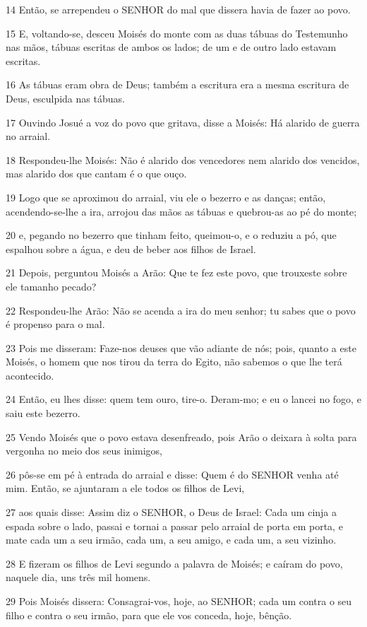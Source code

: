 \par 14 Então, se arrependeu o SENHOR do mal que dissera havia de fazer ao povo.
\par 15 E, voltando-se, desceu Moisés do monte com as duas tábuas do Testemunho nas mãos, tábuas escritas de ambos os lados; de um e de outro lado estavam escritas.
\par 16 As tábuas eram obra de Deus; também a escritura era a mesma escritura de Deus, esculpida nas tábuas.
\par 17 Ouvindo Josué a voz do povo que gritava, disse a Moisés: Há alarido de guerra no arraial.
\par 18 Respondeu-lhe Moisés: Não é alarido dos vencedores nem alarido dos vencidos, mas alarido dos que cantam é o que ouço.
\par 19 Logo que se aproximou do arraial, viu ele o bezerro e as danças; então, acendendo-se-lhe a ira, arrojou das mãos as tábuas e quebrou-as ao pé do monte;
\par 20 e, pegando no bezerro que tinham feito, queimou-o, e o reduziu a pó, que espalhou sobre a água, e deu de beber aos filhos de Israel.
\par 21 Depois, perguntou Moisés a Arão: Que te fez este povo, que trouxeste sobre ele tamanho pecado?
\par 22 Respondeu-lhe Arão: Não se acenda a ira do meu senhor; tu sabes que o povo é propenso para o mal.
\par 23 Pois me disseram: Faze-nos deuses que vão adiante de nós; pois, quanto a este Moisés, o homem que nos tirou da terra do Egito, não sabemos o que lhe terá acontecido.
\par 24 Então, eu lhes disse: quem tem ouro, tire-o. Deram-mo; e eu o lancei no fogo, e saiu este bezerro.
\par 25 Vendo Moisés que o povo estava desenfreado, pois Arão o deixara à solta para vergonha no meio dos seus inimigos,
\par 26 pôs-se em pé à entrada do arraial e disse: Quem é do SENHOR venha até mim. Então, se ajuntaram a ele todos os filhos de Levi,
\par 27 aos quais disse: Assim diz o SENHOR, o Deus de Israel: Cada um cinja a espada sobre o lado, passai e tornai a passar pelo arraial de porta em porta, e mate cada um a seu irmão, cada um, a seu amigo, e cada um, a seu vizinho.
\par 28 E fizeram os filhos de Levi segundo a palavra de Moisés; e caíram do povo, naquele dia, uns três mil homens.
\par 29 Pois Moisés dissera: Consagrai-vos, hoje, ao SENHOR; cada um contra o seu filho e contra o seu irmão, para que ele vos conceda, hoje, bênção.
